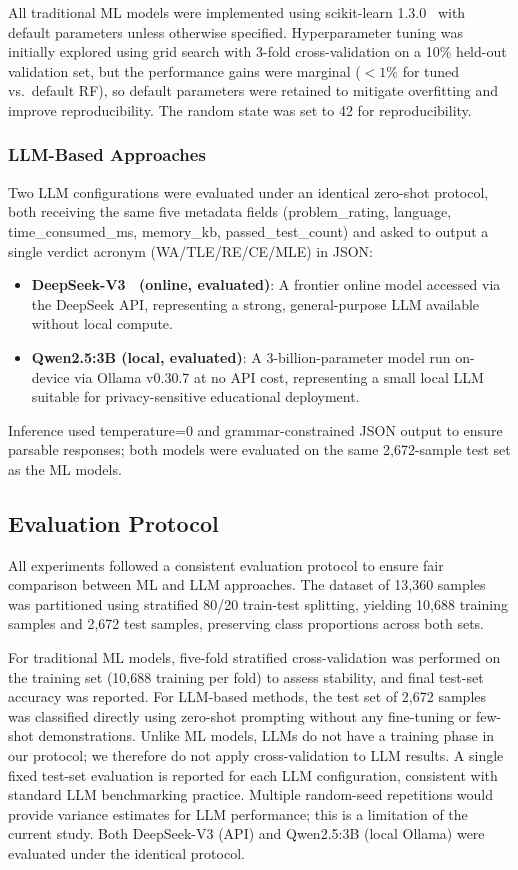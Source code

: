 \documentclass[acmsmall]{acmart}
\begin{document}
All traditional ML models were implemented using scikit-learn
1.3.0~\cite{pedregosa2011scikit} with default parameters unless otherwise
specified. Hyperparameter tuning was initially explored using grid search
with 3-fold cross-validation on a 10\% held-out validation set, but the
performance gains were marginal ($< 1\%$ for tuned vs.\ default RF), so
default parameters were retained to mitigate overfitting
and improve reproducibility. The random state was set to 42 for
reproducibility.

\subsubsection*{LLM-Based Approaches}
Two LLM configurations were evaluated under an identical zero-shot protocol,
both receiving the same five metadata fields (problem\_rating, language,
time\_consumed\_ms, memory\_kb, passed\_test\_count) and asked to output a
single verdict acronym (WA/TLE/RE/CE/MLE) in JSON:
\begin{itemize}
 \item \textbf{DeepSeek-V3~\cite{deepseek2024deepseekv3} (online, evaluated)}: A frontier online model
 accessed via the DeepSeek API, representing a strong,
 general-purpose LLM available without local compute.
 \item \textbf{Qwen2.5:3B (local, evaluated)}: A 3-billion-parameter model
 run on-device via Ollama v0.30.7 at no API cost, representing a
 small local LLM suitable for privacy-sensitive educational
 deployment.
\end{itemize}
Inference used temperature=0 and grammar-constrained JSON output to ensure
parsable responses; both models were evaluated on the same 2,672-sample test
set as the ML models.

\subsection{Evaluation Protocol}

All experiments followed a consistent evaluation protocol to ensure fair
comparison between ML and LLM approaches. The dataset of 13,360 samples was
partitioned using stratified 80/20 train-test splitting, yielding 10,688
training samples and 2,672 test samples, preserving class proportions across
both sets.

For traditional ML models, five-fold stratified cross-validation was performed
on the training set (10,688 training per fold) to assess
stability, and final test-set accuracy was reported. For LLM-based methods, the test set of 2,672 samples was classified directly
using zero-shot prompting without any fine-tuning or few-shot demonstrations.
Unlike ML models, LLMs do not have a training phase in our protocol; we therefore
do not apply cross-validation to LLM results. A single fixed test-set evaluation
is reported for each LLM configuration, consistent with standard LLM benchmarking
practice. Multiple random-seed repetitions would provide variance estimates for
LLM performance; this is a limitation of the current study.
Both DeepSeek-V3 (API) and Qwen2.5:3B (local Ollama) were evaluated under the
identical protocol.
\end{document}
